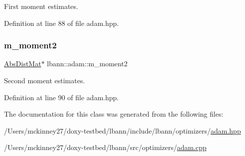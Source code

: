 First moment estimates. 

Definition at line 88 of file adam.\+hpp.

\mbox{\label{classlbann_1_1adam_aea3295a0ee7da5e9c56fd6ff2f05c63f}} 
\subsubsection{\texorpdfstring{m\+\_\+moment2}{m\_moment2}}
{\footnotesize\ttfamily \hyperlink{base_8hpp_a9a697a504ae84010e7439ffec862b470}{Abs\+Dist\+Mat}$\ast$ lbann\+::adam\+::m\+\_\+moment2\hspace{0.3cm}{\ttfamily [private]}}

Second moment estimates. 

Definition at line 90 of file adam.\+hpp.



The documentation for this class was generated from the following files\+:\begin{DoxyCompactItemize}
\item 
/\+Users/mckinney27/doxy-\/testbed/lbann/include/lbann/optimizers/\hyperlink{adam_8hpp}{adam.\+hpp}\item 
/\+Users/mckinney27/doxy-\/testbed/lbann/src/optimizers/\hyperlink{adam_8cpp}{adam.\+cpp}\end{DoxyCompactItemize}
